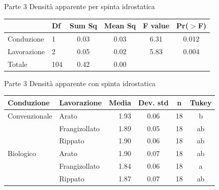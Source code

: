 \documentclass[10pt]{beamer}
\begin{document}
\begin{frame}{Parte 3 \small{Densità apparente per \alert{spinta idrostatica}}}
  \begin{table}
    \centering
    \begin{tabular}{llcccc}
      \hline
      & Df  & Sum Sq & Mean Sq & F value & Pr($>$F) \\ 
      \hline
      Conduzione  & 1   & 0.03   & 0.03    & 6.31    & 0.012    \\ 
      Lavorazione & 2   & 0.05   & 0.02    & 5.83    & 0.004    \\ 
      Totale      & 104 & 0.42   & 0.00    &         &          \\ 
      \hline
    \end{tabular}
    \label{tab:Anova densita per spinta}
  \end{table}

\end{frame}

\begin{frame}{Parte 3 \small{Densità apparente con \alert{spinta idrostatica}}}

  \footnotesize
  \begin{table}[ht]
    \centering
    \begin{tabular}{llrccc}
      \hline
      Conduzione    & Lavorazione   & Media& Dev. std & n    & Tukey \\ 
      \hline
      Convenzionale & Arato         & 1.93 & 0.06      &  18 & b     \\ 
                    & Frangizollato & 1.89 & 0.05      &  18 & ab    \\ 
                    & Rippato       & 1.90 & 0.06      &  18 & ab    \\ 
      Biologico     & Arato         & 1.90 & 0.07      &  18 & ab    \\ 
                    & Frangizollato & 1.84 & 0.06      &  18 & a     \\ 
                    & Rippato       & 1.87 & 0.07      &  18 & ab    \\ 
      \hline
    \end{tabular}
    \label{tab:RiassuntoDensitaSpinta}
  \end{table}
\end{frame}
\end{document}
